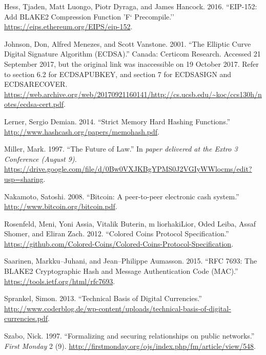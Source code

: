 \documentclass[
]{ltjsarticle}
\newlength{\cslhangindent}
\newlength{\cslentryspacingunit} %
\newenvironment{CSLReferences}[2] %
 {%
  \setlength{\parindent}{0pt}
  \ifodd #1
  \let\oldpar\par
  \def\par{\hangindent=\cslhangindent\oldpar}
  \fi
  \setlength{\parskip}{#2\cslentryspacingunit}
 }%
 {}
\begin{document}
\begin{CSLReferences}{1}{0}
\leavevmode{}%
Hess, Tjaden, Matt Luongo, Piotr Dyraga, and James Hancock. 2016.
``EIP-152: Add BLAKE2 Compression Function 'F` Precompile.''
\url{https://eips.ethereum.org/EIPS/eip-152}.

\leavevmode{}%
Johnson, Don, Alfred Menezes, and Scott Vanstone. 2001. ``The Elliptic
Curve Digital Signature Algorithm (ECDSA).'' Canada: Certicom Research.
Accessed 21 September 2017, but the original link was inaccessible on 19
October 2017. Refer to section 6.2 for ECDSAPUBKEY, and section 7 for
ECDSASIGN and ECDSARECOVER.
\url{https://web.archive.org/web/20170921160141/http://cs.ucsb.edu/~koc/ccs130h/notes/ecdsa-cert.pdf}.

\leavevmode{}%
Lerner, Sergio Demian. 2014. ``Strict Memory Hard Hashing Functions.''
\url{http://www.hashcash.org/papers/memohash.pdf}.

\leavevmode{}%
Miller, Mark. 1997. ``{The Future of Law}.'' In \emph{{paper delivered
at the Extro 3 Conference (August 9)}}.
\url{https://drive.google.com/file/d/0Bw0VXJKBgYPMS0J2VGIyWWlocms/edit?usp=sharing}.

\leavevmode{}%
Nakamoto, Satoshi. 2008. ``{Bitcoin: A peer-to-peer electronic cash
system}.'' \url{http://www.bitcoin.org/bitcoin.pdf}.

\leavevmode{}%
Rosenfeld, Meni, Yoni Assia, Vitalik Buterin, m liorhakiLior, Oded
Leiba, Assaf Shomer, and Eliran Zach. 2012. ``Colored Coins Protocol
Specification.''
\url{https://github.com/Colored-Coins/Colored-Coins-Protocol-Specification}.

\leavevmode{}%
Saarinen, Markku--Juhani, and Jean--Philippe Aumasson. 2015. ``RFC 7693:
The BLAKE2 Cryptographic Hash and Message Authentication Code (MAC).''
\url{https://tools.ietf.org/html/rfc7693}.

\leavevmode{}%
Sprankel, Simon. 2013. ``{Technical Basis of Digital Currencies}.''
\url{http://www.coderblog.de/wp-content/uploads/technical-basis-of-digital-currencies.pdf}.

\leavevmode{}%
Szabo, Nick. 1997. ``{Formalizing and securing relationships on public
networks}.'' \emph{First Monday} 2 (9).
\url{http://firstmonday.org/ojs/index.php/fm/article/view/548}.


\end{CSLReferences}
\end{document}
